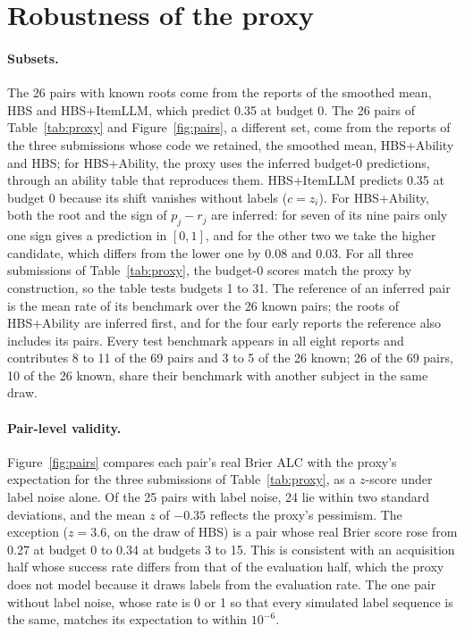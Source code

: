 \documentclass{article}
\begin{document}
\FloatBarrier
\section{Robustness of the proxy}
\label{app:robust}

\paragraph{Subsets.} The 26 pairs with known roots come from the reports of the smoothed mean, HBS and HBS+ItemLLM, which predict 0.35 at budget 0. The 26 pairs of Table~\ref{tab:proxy} and Figure~\ref{fig:pairs}, a different set, come from the reports of the three submissions whose code we retained, the smoothed mean, HBS+Ability and HBS; for HBS+Ability, the proxy uses the inferred budget-0 predictions, through an ability table that reproduces them. HBS+ItemLLM predicts 0.35 at budget 0 because its shift vanishes without labels ($c = z_i$). For HBS+Ability, both the root and the sign of $p_j - r_j$ are inferred: for seven of its nine pairs only one sign gives a prediction in $[0, 1]$, and for the other two we take the higher candidate, which differs from the lower one by 0.08 and 0.03. For all three submissions of Table~\ref{tab:proxy}, the budget-0 scores match the proxy by construction, so the table tests budgets 1 to 31. The reference of an inferred pair is the mean rate of its benchmark over the 26 known pairs; the roots of HBS+Ability are inferred first, and for the four early reports the reference also includes its pairs. Every test benchmark appears in all eight reports and contributes 8 to 11 of the 69 pairs and 3 to 5 of the 26 known; 26 of the 69 pairs, 10 of the 26 known, share their benchmark with another subject in the same draw.

\paragraph{Pair-level validity.} Figure~\ref{fig:pairs} compares each pair's real Brier ALC with the proxy's expectation for the three submissions of Table~\ref{tab:proxy}, as a $z$-score under label noise alone. Of the 25 pairs with label noise, 24 lie within two standard deviations, and the mean $z$ of $-0.35$ reflects the proxy's pessimism. The exception ($z = 3.6$, on the draw of HBS) is a pair whose real Brier score rose from 0.27 at budget 0 to 0.34 at budgets 3 to 15. This is consistent with an acquisition half whose success rate differs from that of the evaluation half, which the proxy does not model because it draws labels from the evaluation rate. The one pair without label noise, whose rate is 0 or 1 so that every simulated label sequence is the same, matches its expectation to within $10^{-6}$.
\end{document}

